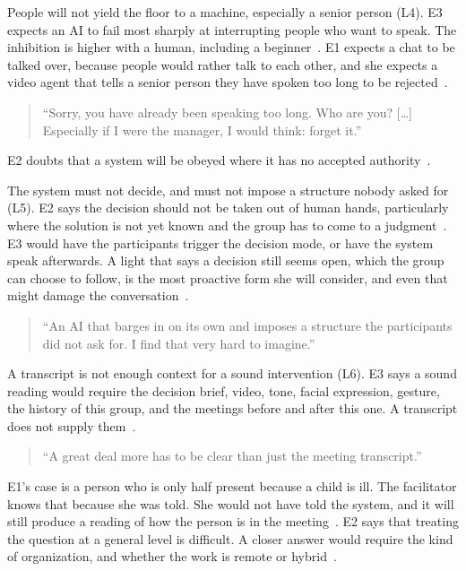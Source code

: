 People will not yield the floor to a machine, especially a senior person (L4).
E3 expects an AI to fail most sharply at interrupting people who want to speak.
The inhibition is higher with a human, including a beginner~.
E1 expects a chat to be talked over, because people would rather talk to each other, and she
expects a video agent that tells a senior person they have spoken too long to be
rejected~.
{\setlength{\topsep}{0.25\baselineskip}\setlength{\partopsep}{0pt}%
  \begin{quote}\small
    \enquote{Sorry, you have already been speaking too long. Who are you? [\ldots] Especially if I
    were the manager, I would think: forget it.}~
\end{quote}}
E2 doubts that a system will be obeyed where it has no accepted authority~.

The system must not decide, and must not impose a structure nobody asked for (L5).
E2 says the decision should not be taken out of human hands, particularly where the solution
is not yet known and the group has to come to a judgment~.
E3 would have the participants trigger the decision mode, or have the system speak
afterwards.
A light that says a decision still seems open, which the group can choose to follow, is the
most proactive form she will consider, and even that might damage the
conversation~.
{\setlength{\topsep}{0.25\baselineskip}\setlength{\partopsep}{0pt}%
  \begin{quote}\small
    \enquote{An AI that barges in on its own and imposes a structure the participants did not
    ask for. I find that very hard to imagine.}~
\end{quote}}

A transcript is not enough context for a sound intervention (L6).
E3 says a sound reading would require the decision brief, video, tone, facial expression,
gesture, the history of this group, and the meetings before and after this one.
A transcript does not supply them~.
{\setlength{\topsep}{0.25\baselineskip}\setlength{\partopsep}{0pt}%
  \begin{quote}\small
    \enquote{A great deal more has to be clear than just the meeting transcript.}~
\end{quote}}
E1's case is a person who is only half present because a child is ill.
The facilitator knows that because she was told.
She would not have told the system, and it will still produce a reading of how the person
is in the meeting~.
E2 says that treating the question at a general level is difficult.
A closer answer would require the kind of organization, and whether the work is remote or
hybrid~.

